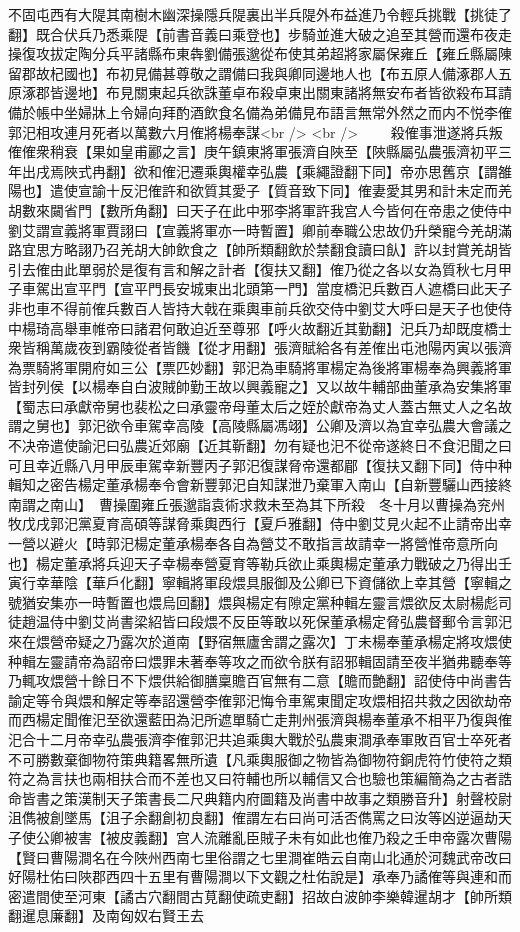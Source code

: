不固屯西有大隄其南樹木幽深操隱兵隄裏出半兵隄外布益進乃令輕兵挑戰【挑徒了翻】既合伏兵乃悉乘隄【前書音義曰乘登也】步騎並進大破之追至其營而還布夜走操復攻拔定陶分兵平諸縣布東犇劉備張邈從布使其弟超將家屬保雍丘【雍丘縣屬陳留郡故杞國也】布初見備甚尊敬之謂備曰我與卿同邊地人也【布五原人備涿郡人五原涿郡皆邊地】布見關東起兵欲誅董卓布殺卓東出關東諸將無安布者皆欲殺布耳請備於帳中坐婦牀上令婦向拜酌酒飲食名備為弟備見布語言無常外然之而内不悦李傕郭汜相攻連月死者以萬數六月傕將楊奉謀<br />
<br />
　　殺傕事泄遂將兵叛傕傕衆稍衰【果如皇甫酈之言】庚午鎮東將軍張濟自陜至【陜縣屬弘農張濟初平三年出戌焉陜式冉翻】欲和傕汜遷乘輿權幸弘農【乘繩證翻下同】帝亦思舊京【謂雒陽也】遣使宣諭十反汜傕許和欲質其愛子【質音致下同】傕妻愛其男和計未定而羌胡數來闚省門【數所角翻】曰天子在此中邪李將軍許我宫人今皆何在帝患之使侍中劉艾謂宣義將軍賈詡曰【宣義將軍亦一時暫置】卿前奉職公忠故仍升榮寵今羌胡滿路宜思方略詡乃召羌胡大帥飲食之【帥所類翻飲於禁翻食讀曰飤】許以封賞羌胡皆引去傕由此單弱於是復有言和解之計者【復扶又翻】傕乃從之各以女為質秋七月甲子車駕出宣平門【宣平門長安城東出北頭第一門】當度橋汜兵數百人遮橋曰此天子非也車不得前傕兵數百人皆持大戟在乘輿車前兵欲交侍中劉艾大呼曰是天子也使侍中楊琦高舉車帷帝曰諸君何敢迫近至尊邪【呼火故翻近其勤翻】汜兵乃却既度橋士衆皆稱萬歲夜到霸陵從者皆饑【從才用翻】張濟賦給各有差傕出屯池陽丙寅以張濟為票騎將軍開府如三公【票匹妙翻】郭汜為車騎將軍楊定為後將軍楊奉為興義將軍皆封列侯【以楊奉自白波賊帥勤王故以興義寵之】又以故牛輔部曲董承為安集將軍【蜀志曰承獻帝舅也裴松之曰承靈帝母董太后之姪於獻帝為丈人蓋古無丈人之名故謂之舅也】郭汜欲令車駕幸高陵【高陵縣屬馮翊】公卿及濟以為宜幸弘農大會議之不决帝遣使諭汜曰弘農近郊廟【近其靳翻】勿有疑也汜不從帝遂終日不食汜聞之曰可且幸近縣八月甲辰車駕幸新豐丙子郭汜復謀脅帝還都郿【復扶又翻下同】侍中种輯知之密告楊定董承楊奉令會新豐郭汜自知謀泄乃棄軍入南山【自新豐驪山西接終南謂之南山】　曹操圍雍丘張邈詣袁術求救未至為其下所殺　冬十月以曹操為兖州牧戊戌郭汜黨夏育高碩等謀脅乘輿西行【夏戶雅翻】侍中劉艾見火起不止請帝出幸一營以避火【時郭汜楊定董承楊奉各自為營艾不敢指言故請幸一將營惟帝意所向也】楊定董承將兵迎天子幸楊奉營夏育等勒兵欲止乘輿楊定董承力戰破之乃得出壬寅行幸華陰【華戶化翻】寧輯將軍段煨具服御及公卿已下資儲欲上幸其營【寧輯之號猶安集亦一時暫置也煨烏回翻】煨與楊定有隙定黨种輯左靈言煨欲反太尉楊彪司徒趙温侍中劉艾尚書梁紹皆曰段煨不反臣等敢以死保董承楊定脅弘農督郵令言郭汜來在煨營帝疑之乃露次於道南【野宿無廬舍謂之露次】丁未楊奉董承楊定將攻煨使种輯左靈請帝為詔帝曰煨罪未著奉等攻之而欲令朕有詔邪輯固請至夜半猶弗聽奉等乃輒攻煨營十餘日不下煨供給御膳稟贍百官無有二意【贍而艶翻】詔使侍中尚書告諭定等令與煨和解定等奉詔還營李傕郭汜悔令車駕東聞定攻煨相招共救之因欲劫帝而西楊定聞傕汜至欲還藍田為汜所遮單騎亡走荆州張濟與楊奉董承不相平乃復與傕汜合十二月帝幸弘農張濟李傕郭汜共追乘輿大戰於弘農東澗承奉軍敗百官士卒死者不可勝數棄御物符策典籍畧無所遺【凡乘輿服御之物皆為御物符銅虎符竹使符之類符之為言扶也兩相扶合而不差也又曰符輔也所以輔信又合也驗也策編簡為之古者誥命皆書之策漢制天子策書長二尺典籍内府圖籍及尚書中故事之類勝音升】射聲校尉沮儁被創墜馬【沮子余翻創初良翻】傕謂左右曰尚可活否儁罵之曰汝等凶逆逼劫天子使公卿被害【被皮義翻】宫人流離亂臣賊子未有如此也傕乃殺之壬申帝露次曹陽【賢曰曹陽澗名在今陜州西南七里俗謂之七里澗崔皓云自南山北通於河魏武帝改曰好陽杜佑曰陜郡西四十五里有曹陽澗以下文觀之杜佑說是】承奉乃譎傕等與連和而密遣間使至河東【譎古穴翻間古莧翻使疏吏翻】招故白波帥李樂韓暹胡才【帥所類翻暹息廉翻】及南匈奴右賢王去